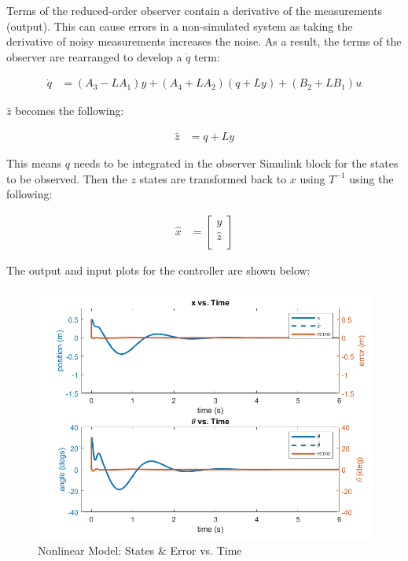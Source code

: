 \documentclass[12pt, letterpaper, onecolumn]{article}
\begin{document}
Terms of the reduced-order observer contain a derivative of the measurements (output). This can cause errors in a non-simulated system as taking the derivative of noisy measurements increases the noise. As a result, the terms of the observer are rearranged to develop a $\dot{q}$ term:

\begin{equation*}
    \begin{split}
        \dot{q} & = (A_3-LA_1)y +(A_4+LA_2)(q+Ly)+(B_2+LB_1)u
    \end{split}
\end{equation*}

$\hat{z}$ becomes the following:

\begin{equation*}
    \begin{split}
        \hat{z} & = q + Ly
    \end{split}
\end{equation*}

This means $q$ needs to be integrated in the observer Simulink block for the states to be observed. Then the $z$ states are transformed back to $x$ using $T^{-1}$ using the following:

\begin{equation*}
    \begin{split}
        \hat{x} & =
        \begin{bmatrix}
            y       \\
            \hat{z} \\
        \end{bmatrix}
    \end{split}
\end{equation*}

\clearpage

The output and input plots for the controller are shown below:

\begin{figure}[!h]
    \centering
    \includegraphics[width=\linewidth]{figs/p6-a-states.png}
    \caption{Nonlinear Model: States \& Error vs. Time}
    \label{}
\end{figure}
\end{document}
